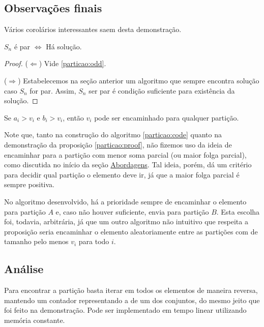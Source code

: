 \subsection*{Observações finais}

Vários corolários interessantes saem desta demonstração.

\begin{cor}
$S_n$ é par $\Leftrightarrow$ Há solução.
\end{cor}
\begin{proof}

($\Leftarrow$) Vide \ref{particao:odd}.

($\Rightarrow$) Estabelecemos na seção anterior um algoritmo que sempre encontra solução caso $S_n$ for par. Assim, $S_n$ ser par é condição suficiente para existência da solução.

\end{proof}

\begin{cor}
Se $a_i > v_i$ e $b_i > v_i$, então $v_i$ pode ser encaminhado para qualquer partição.
\end{cor}

Note que, tanto na construção do algoritmo \ref{particao:code} quanto na demonstração da proposição \ref{particao:proof}, não fizemos uso da ideia de encaminhar para a partição com menor soma parcial (ou maior folga parcial), como discutida no início da seção \hyperref[particao:abordagem]{Abordagens}. Tal ideia, porém, dá um critério para decidir qual partição o elemento deve ir, já que a maior folga parcial é sempre positiva.

No algoritmo desenvolvido, há a prioridade sempre de encaminhar o elemento para partição $A$ e, caso não houver  suficiente, envia para partição $B$. Esta escolha foi, todavia, arbitrária, já que um outro algoritmo não intuitivo que respeita a proposição seria encaminhar o elemento aleatoriamente entre as partições com  de tamanho pelo menos $v_i$ para todo $i$.

\subsection*{Análise}

Para encontrar a partição basta iterar em todos os elementos de maneira reversa, mantendo um contador representando a  de um dos conjuntos, do mesmo jeito que foi feito na demonstração. Pode ser implementado em tempo linear utilizando memória constante.